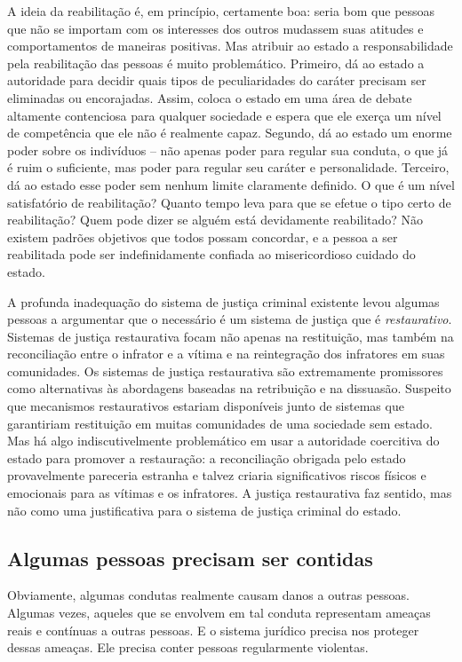 A ideia da reabilitação é, em princípio, certamente boa: seria bom que pessoas que não se importam com os interesses dos outros mudassem suas atitudes e comportamentos de maneiras positivas. Mas atribuir ao estado a responsabilidade pela reabilitação das pessoas é muito problemático. Primeiro, dá ao estado a autoridade para decidir quais tipos de peculiaridades do caráter precisam ser eliminadas ou encorajadas. Assim, coloca o estado em uma área de debate altamente contenciosa para qualquer sociedade e espera que ele exerça um nível de competência que ele não é realmente capaz. Segundo, dá ao estado um enorme poder sobre os indivíduos -- não apenas poder para regular sua conduta, o que já é ruim o suficiente, mas poder para regular seu caráter e personalidade. Terceiro, dá ao estado esse poder sem nenhum limite claramente definido. O que é um nível satisfatório de reabilitação? Quanto tempo leva para que se efetue o tipo certo de reabilitação? Quem pode dizer se alguém está devidamente reabilitado? Não existem padrões objetivos que todos possam concordar, e a pessoa a ser reabilitada pode ser indefinidamente confiada ao misericordioso cuidado do estado.

A profunda inadequação do sistema de justiça criminal existente levou algumas pessoas a argumentar que o necessário é um sistema de justiça que é \emph{restaurativo}. Sistemas de justiça restaurativa focam não apenas na restituição, mas também na reconciliação entre o infrator e a vítima e na reintegração dos infratores em suas comunidades. Os sistemas de justiça restaurativa são extremamente promissores como alternativas às abordagens baseadas na retribuição e na dissuasão. Suspeito que mecanismos restaurativos estariam disponíveis junto de sistemas que garantiriam restituição em muitas comunidades de uma sociedade sem estado. Mas há algo indiscutivelmente problemático em usar a autoridade coercitiva do estado para promover a restauração: a reconciliação obrigada pelo estado provavelmente pareceria estranha e talvez criaria significativos riscos físicos e emocionais para as vítimas e os infratores. A justiça restaurativa faz sentido, mas não como uma justificativa para o sistema de justiça criminal do estado.

\subsection*{Algumas pessoas precisam ser contidas}

Obviamente, algumas condutas realmente causam danos a outras pessoas. Algumas vezes, aqueles que se envolvem em tal conduta representam ameaças reais e contínuas a outras pessoas. E o sistema jurídico precisa nos proteger dessas ameaças. Ele precisa conter pessoas regularmente violentas.

